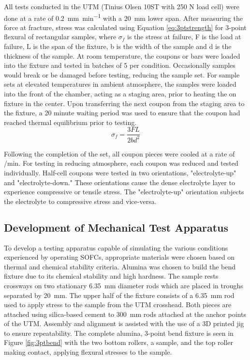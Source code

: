     All tests conducted in the UTM (Tinius Olsen 10ST with 250 N load cell) were done at a rate of \SI{0.2}{\milli\meter\per\minute} with a \SI{20}{\milli\meter} lower span.
    After measuring the force at fracture, stress was calculated using Equation \ref{eq:3ptstrength}
    for 3-point flexural of rectangular samples, where \(\sigma_{f}\) is the stress at failure, F is the load at failure, L is the span of the fixture, b is the width of the sample and d is the thickness of the sample.
    At room temperature, the coupons or bars were loaded into the fixture and tested in batches of 5 per condition.
    Occasionally samples would break or be damaged before testing, reducing the sample set.
    For sample sets at elevated temperatures in ambient atmosphere, the samples were loaded into the front of the chamber, acting as a staging area,
    prior to heating the on fixture in the center.
    Upon transferring the next coupon from the staging area to the fixture, a 20 minute waiting period was used to ensure that the coupon had reached thermal equilibrium prior to testing.
    \begin{equation}
        \sigma_{f} = \frac{3FL}{2bd^{2}}
        \label{eq:3ptstrength}
    \end{equation}

    Following the completion of the set, all coupon pieces were cooled at a rate of /min.
    For testing in reducing atmosphere, each coupon was reduced and tested individually.
    Half-cell coupons were tested in two orientations, "electrolyte-up" and "electrolyte-down." These orientations cause the dense electrolyte layer to experience compressive or tensile stress.
    The "electrolyte-up" orientation subjects the electrolyte to compressive stress and vice-versa.

    \subsection{Development of Mechanical Test Apparatus}
        To develop a testing apparatus capable of simulating the various conditions experienced by operating SOFCs, appropriate materials were chosen based on thermal and chemical stability criteria.
        Alumina was chosen to build the bend fixture due to its chemical stability and high hardness.
        The sample rests crossways on two stationary \SI{6.35}{\milli\meter} diameter rods which are placed in troughs separated by \SI{20}{\milli\meter}.
        The upper half of the fixture consists of a \SI{6.35}{\milli\meter} rod used to apply stress to the sample from the UTM crosshead.
        Both pieces are attached using silica-based cement to \SI{300}{\milli\meter} rods attached at the anchor points of the UTM.
        Assembly and alignment is assisted with the use of a 3D printed jig to ensure repeatability.
        The complete alumina, 3-point bend fixture is seen in Figure \ref{fig:3ptbend} with the two bottom rollers, a sample, and the top roller making contact, applying flexural stresses to the sample.

